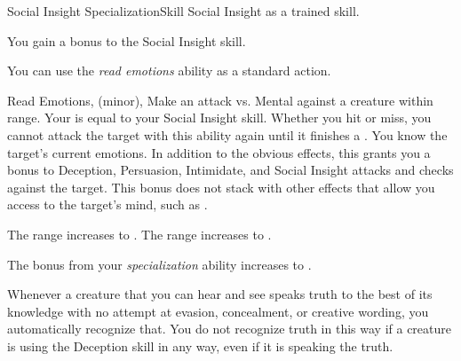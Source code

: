     \begin{feat}{Social Insight Specialization}{Skill}
        \featpre Social Insight as a trained skill.

         You gain a  bonus to the Social Insight skill.

         You can use the \textit{read emotions} ability as a standard action.
        \begin{sustainability}{Read Emotions}{,  (minor), }
            \rankline
            Make an attack vs. Mental against a creature within \rngshort range.
            Your  is equal to your Social Insight skill.
            Whether you hit or miss, you cannot attack the target with this ability again until it finishes a .
            \hit You know the target's current emotions.
            In addition to the obvious effects, this grants you a  bonus to Deception, Persuasion, Intimidate, and Social Insight attacks and checks against the target.
            This bonus does not stack with other effects that allow you access to the target's mind, such as .

            \rankline
             The range increases to \medrange.
             The range increases to \longrange.
        \end{sustainability}

         The bonus from your \textit{specialization} ability increases to .

         Whenever a creature that you can hear and see speaks truth to the best of its knowledge with no attempt at evasion, concealment, or creative wording, you automatically recognize that.
        You do not recognize truth in this way if a creature is using the Deception skill in any way, even if it is speaking the truth.
    \end{feat}

